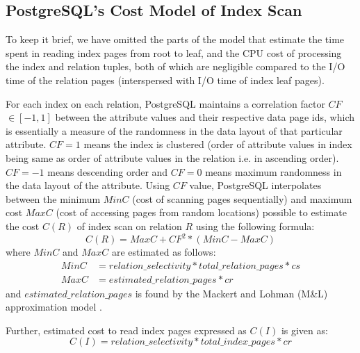 \documentclass{article}
\begin{document}
\begin{multicols}{2}
	\section{PostgreSQL's Cost Model of Index Scan}
	\label{sec:cs_index}
	To keep it brief, we have omitted the parts of the model that estimate the time spent in reading index pages from root to leaf, and the CPU cost of processing the index and relation tuples, both of which are negligible compared to the I/O time of the relation pages (interspersed with I/O time of index leaf pages).
	
	For each index on each relation, PostgreSQL maintains a correlation factor $CF$ $\in[-1,1]$ between the attribute values and their respective data page ids, which is essentially a measure of the randomness in the data layout of that particular attribute. $CF = 1$ means the index is clustered (order of attribute values in index being same as order of attribute values in the relation i.e. in ascending order). $CF = -1$ means descending order and $CF = 0$ means maximum randomness in the data layout of the attribute. Using $CF$ value, PostgreSQL interpolates between the minimum $MinC$ (cost of scanning pages sequentially) and maximum cost $MaxC$ (cost of accessing pages from random locations) possible to estimate the cost $C(R)$ of index scan on relation $R$ using the following formula:
	\[C(R) = MaxC + CF^{2}*(MinC - MaxC)\]
	where $MinC$ and $MaxC$ are estimated as follows:
	\begin{equation*}
	\begin{split}
	MinC & = relation\_selectivity * total\_relation\_pages * cs\\
	MaxC & = estimated\_relation\_pages * cr
	\end{split}
	\end{equation*}
	and $estimated\_relation\_pages$ is found by the Mackert and Lohman (M\&L) approximation model \cite{lnm}. 

	Further, estimated cost to read index pages expressed as $C(I)$ is given as:
	\[C(I) = relation\_selectivity * total\_index\_pages * cr\]
	

\end{multicols}
\end{document}
